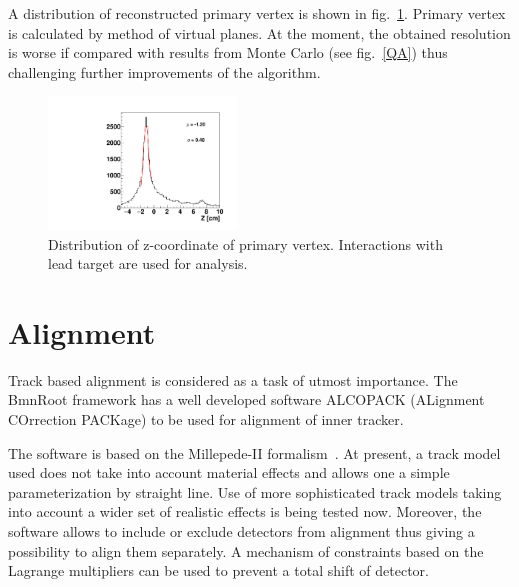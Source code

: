 \documentclass{webofc}
\begin{document}
A distribution of reconstructed primary vertex is shown in fig.~\ref{vertex}. Primary vertex is calculated by method of virtual planes.
At the moment, the obtained resolution is worse if compared with results from Monte Carlo (see fig.~\ref{QA}) thus challenging further improvements of the algorithm.   
\begin{figure}[h]
  \centering
  \includegraphics[width=5cm,clip]{fig6.pdf}
  \caption{Distribution of z-coordinate of primary vertex. Interactions with lead target are used for analysis.}
  \label{vertex}       %
\end{figure}


\section{Alignment}
\label{alignment}

Track based alignment is considered as a task of utmost importance.
The BmnRoot framework has a well developed software ALCOPACK (ALignment COrrection PACKage) to be used for alignment of inner tracker.

The software is based on the Millepede-II formalism~\cite{Blobel:2002ax}.
At present, a track model used does not take into account material effects and allows one a simple parameterization by straight line.
Use of more sophisticated track models taking into account a wider set of realistic effects is being tested now.
Moreover, the software allows to include or exclude detectors from alignment thus giving a possibility to align them separately.
A mechanism of constraints based on the Lagrange multipliers can be used to prevent a total shift of detector.
\end{document}
